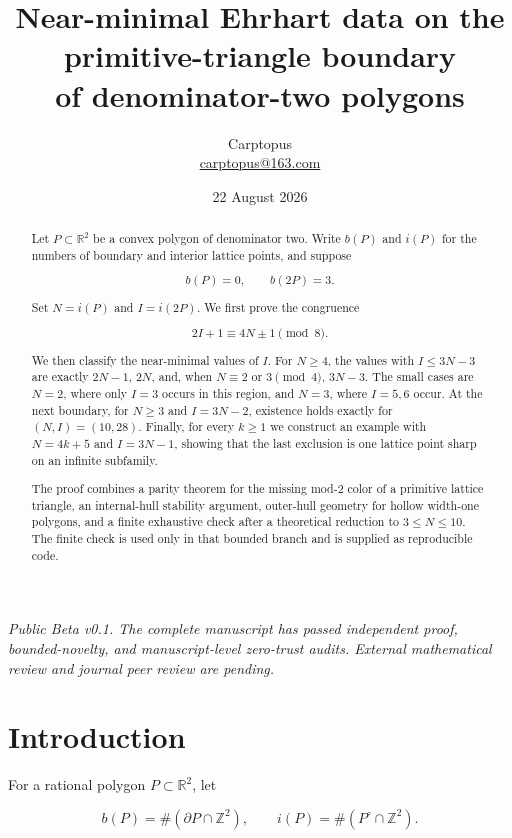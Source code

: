 \documentclass[11pt]{article}
\title{Near-minimal Ehrhart data on the primitive-triangle boundary\\of denominator-two polygons}
\author{Carptopus\\\href{mailto:carptopus@163.com}{carptopus@163.com}}
\date{22 August 2026}
\theoremstyle{remark}
\numberwithin{equation}{section}
\begin{document}
\maketitle

\begin{center}
\small\itshape
Public Beta v0.1. The complete manuscript has passed independent proof,
bounded-novelty, and manuscript-level zero-trust audits. External mathematical
review and journal peer review are pending.
\end{center}
\vspace{0.8em}



\begin{abstract}

Let $P\subset\mathbb R^2$ be a convex polygon of denominator two. Write $b(P)$ and $i(P)$ for the numbers of boundary and interior lattice points, and suppose

\[
b(P)=0,\qquad b(2P)=3.
\]

Set $N=i(P)$ and $I=i(2P)$. We first prove the congruence

\[
2I+1\equiv 4N\pm1\pmod 8.
\]

We then classify the near-minimal values of $I$. For $N\ge4$, the values with $I\le3N-3$ are exactly $2N-1$, $2N$, and, when $N\equiv2$ or $3\pmod4$, $3N-3$. The small cases are $N=2$, where only $I=3$ occurs in this region, and $N=3$, where $I=5,6$ occur. At the next boundary, for $N\ge3$ and $I=3N-2$, existence holds exactly for $(N,I)=(10,28)$. Finally, for every $k\ge1$ we construct an example with $N=4k+5$ and $I=3N-1$, showing that the last exclusion is one lattice point sharp on an infinite subfamily.

The proof combines a parity theorem for the missing mod-$2$ color of a primitive lattice triangle, an internal-hull stability argument, outer-hull geometry for hollow width-one polygons, and a finite exhaustive check after a theoretical reduction to $3\le N\le10$. The finite check is used only in that bounded branch and is supplied as reproducible code.

\end{abstract}

\section{Introduction}


For a rational polygon $P\subset\mathbb R^2$, let

\[
b(P)=\#(\partial P\cap\mathbb Z^2),\qquad
i(P)=\#(P^\circ\cap\mathbb Z^2).
\]
\end{document}
